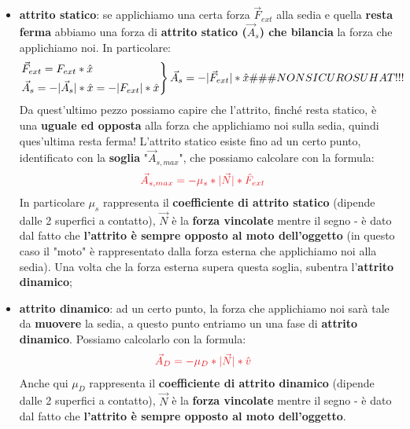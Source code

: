             \begin{itemize}
                \item \textbf{attrito statico}: se applichiamo una certa forza $\vec{F}_{ext}$ alla sedia e quella \textbf{resta ferma} abbiamo una forza di \textbf{attrito statico ($\vec{A}_s$) che bilancia} la forza che applichiamo noi. In particolare:
                \begin{align*}
                    \begin{rcases*}
                        \vec{F}_{ext}=F_{ext}*\hat{x}\\
                        \vec{A}_{s}= -|\vec{A}_s|*\hat{x}=-|F_{ext}|*\hat{x}
                    \end{rcases*}
                    \vec{A}_s=-|\vec{F}_{ext}|*\hat{x} \#\#\#NON SICURO SU HAT!!!
                \end{align*}
                Da quest'ultimo pezzo possiamo capire che l'attrito, finché resta statico, è una \textbf{uguale ed opposta} alla forza che applichiamo noi sulla sedia, quindi ques'ultima resta ferma!
                L'attrito statico esiste fino ad un certo punto, identificato con la \textbf{soglia} "$\vec{A}_{s, max}$", che possiamo calcolare con la formula:
                \begin{align*}
                    &\textcolor{Red}{\vec{A}_{s, max} = -\mu_s*|\vec{N}|*\hat{F}_{ext}}
                \end{align*}
                In particolare $\mu_s$ rappresenta il \textbf{coefficiente di attrito statico} (dipende dalle 2 superfici a contatto), $\vec{N}$ è la \textbf{forza vincolate} mentre il segno - è dato dal fatto che \textbf{l'attrito è sempre opposto al moto dell'oggetto} (in questo caso il "moto" è rappresentato dalla forza esterna che applichiamo noi alla sedia). Una volta che la forza esterna supera questa soglia, subentra l'\textbf{attrito dinamico};

                \item \textbf{attrito dinamico}: ad un certo punto, la forza che applichiamo noi sarà tale da \textbf{muovere} la sedia, a questo punto entriamo un una fase di \textbf{attrito dinamico}. Possiamo calcolarlo con la formula:
                \begin{align*}
                    &\textcolor{Red}{\vec{A}_D = -\mu_D*|\vec{N}|*\hat{v}}
                \end{align*}
                Anche qui $\mu_D$ rappresenta il \textbf{coefficiente di attrito dinamico} (dipende dalle 2 superfici a contatto), $\vec{N}$ è la \textbf{forza vincolate} mentre il segno - è dato dal fatto che \textbf{l'attrito è sempre opposto al moto dell'oggetto}.
            \end{itemize}

